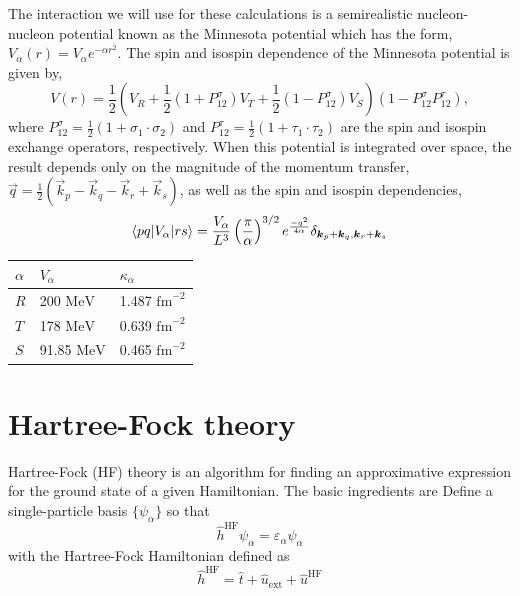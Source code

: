 The interaction we will use for these calculations is a semirealistic nucleon-nucleon potential known as the Minnesota potential which has the form, $V_{\alpha}\left( r\right)=V_{\alpha}e^{-\alpha r^{2}}$. The spin and isospin dependence of the Minnesota potential is given by,
\begin{equation}
V\left( r\right)=\frac{1}{2}\left( V_{R}+\frac{1}{2}\left( 1+P_{12}^{\sigma}\right) V_{T}+\frac{1}{2}\left( 1-P_{12}^{\sigma}\right) V_{S}\right)\left( 1-P_{12}^{\sigma}P_{12}^{\tau}\right),
\end{equation}
where $P_{12}^{\sigma}=\frac{1}{2}\left( 1+\sigma_{1}\cdot\sigma_{2}\right)$ and $P_{12}^{\tau}=\frac{1}{2}\left( 1+\tau_{1}\cdot\tau_{2}\right)$ are the spin and isospin exchange operators, respectively. When this potential is integrated over space, the result depends only on the magnitude of the momentum transfer, $\vec{q}=\frac{1}{2}\left(\vec{k}_{p}-\vec{k}_{q}-\vec{k}_{r}+\vec{k}_{s}\right)$, as well as the spin and isospin dependencies,
\begin{equation}
\braket{pq| V_{\alpha} |rs}=\frac{V_{\alpha}}{L^{3}}\left(\frac{\pi}{\alpha}\right)^{3/2}e^{\frac{-q^{2}}{4\alpha}}\delta_{\vec{k}_{p}+\vec{k}_{q},\vec{k}_{r}+\vec{k}_{s}}
\end{equation}
\begin{center}
  \begin{tabular}{| l | l | l |}
    \hline
    $\alpha$ & $V_{\alpha}$ & $\kappa_{\alpha}$ \\ \hline
    $R$ & 200 $\mathrm{MeV}$ & 1.487 $\mathrm{fm}^{-2}$ \\ \hline
    $T$ & 178 $\mathrm{MeV}$ & 0.639 $\mathrm{fm}^{-2}$ \\ \hline
    $S$ & 91.85 $\mathrm{MeV}$ & 0.465 $\mathrm{fm}^{-2}$ \\ \hline
  \end{tabular}
\end{center}





\section{Hartree-Fock theory}

Hartree-Fock (HF) theory is an algorithm for finding an approximative
expression for the ground state of a given Hamiltonian. The basic
ingredients are Define a single-particle basis $\{\psi_{\alpha}\}$ so
that
\[ 
\hat{h}^{\mathrm{HF}}\psi_{\alpha} = \varepsilon_{\alpha}\psi_{\alpha}
\]
with the Hartree-Fock Hamiltonian defined as
\[
\hat{h}^{\mathrm{HF}}=\hat{t}+\hat{u}_{\mathrm{ext}}+\hat{u}^{\mathrm{HF}}
\]

